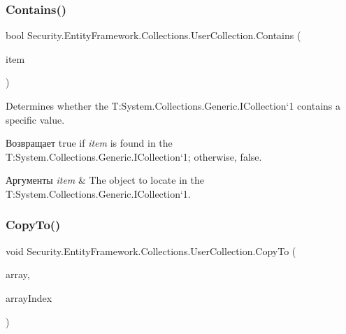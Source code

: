 \subsubsection{\texorpdfstring{Contains()}{Contains()}}
{\footnotesize\ttfamily bool Security.\+Entity\+Framework.\+Collections.\+User\+Collection.\+Contains (\begin{DoxyParamCaption}\item[{\hyperlink{interface_security_1_1_interfaces_1_1_model_1_1_i_user}{I\+User}}]{item }\end{DoxyParamCaption})}



Determines whether the T\+:\+System.\+Collections.\+Generic.\+I\+Collection`1 contains a specific value. 

\begin{DoxyReturn}{Возвращает}
true if {\itshape item}  is found in the T\+:\+System.\+Collections.\+Generic.\+I\+Collection`1; otherwise, false. 
\end{DoxyReturn}

\begin{DoxyParams}{Аргументы}
{\em item} & The object to locate in the T\+:\+System.\+Collections.\+Generic.\+I\+Collection`1.\\
\hline
\end{DoxyParams}
\mbox{\label{class_security_1_1_entity_framework_1_1_collections_1_1_user_collection_a16a3852ec4612141cf6750418eeb21a5}} 
\subsubsection{\texorpdfstring{Copy\+To()}{CopyTo()}}
{\footnotesize\ttfamily void Security.\+Entity\+Framework.\+Collections.\+User\+Collection.\+Copy\+To (\begin{DoxyParamCaption}\item[{\hyperlink{interface_security_1_1_interfaces_1_1_model_1_1_i_user}{I\+User} \mbox{[}$\,$\mbox{]}}]{array,  }\item[{int}]{array\+Index }\end{DoxyParamCaption})}



